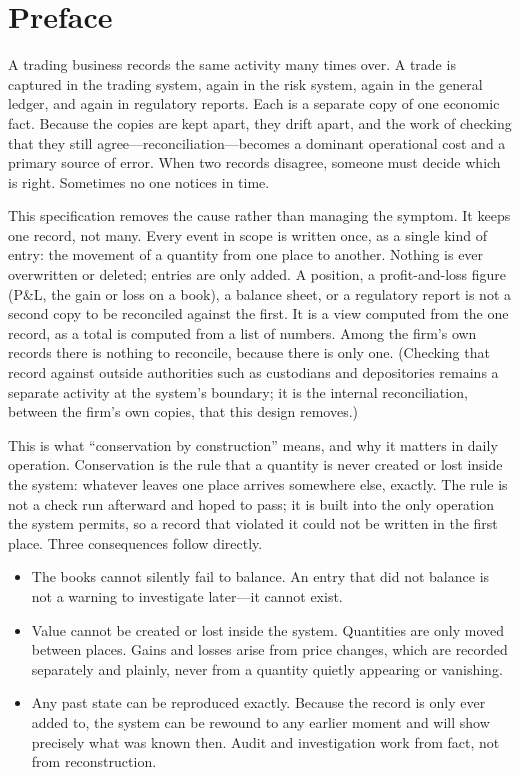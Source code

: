 \section*{Preface}

A trading business records the same activity many times over. A trade is captured in the
trading system, again in the risk system, again in the general ledger, and again in
regulatory reports. Each is a separate copy of one economic fact. Because the copies are
kept apart, they drift apart, and the work of checking that they still agree---reconciliation---becomes
a dominant operational cost and a primary source of error. When two records disagree,
someone must decide which is right. Sometimes no one notices in time.

This specification removes the cause rather than managing the symptom. It keeps one record,
not many. Every event in scope is written once, as a single kind of entry: the movement of
a quantity from one place to another. Nothing is ever overwritten or deleted; entries are
only added. A position, a profit-and-loss figure (P\&L, the gain or loss on a book), a
balance sheet, or a regulatory report is not a second copy to be reconciled against the
first. It is a view computed from the one record, as a total is computed from a list of
numbers. Among the firm's own records there is nothing to reconcile, because there is only
one. (Checking that record against outside authorities such as custodians and depositories
remains a separate activity at the system's boundary; it is the internal reconciliation,
between the firm's own copies, that this design removes.)

This is what ``conservation by construction'' means, and why it matters in daily
operation. Conservation is the rule that a quantity is never created or lost inside the
system: whatever leaves one place arrives somewhere else, exactly. The rule is not a check
run afterward and hoped to pass; it is built into the only operation the system permits, so
a record that violated it could not be written in the first place. Three consequences
follow directly.

\begin{itemize}
\item The books cannot silently fail to balance. An entry that did not balance is not a
warning to investigate later---it cannot exist.
\item Value cannot be created or lost inside the system. Quantities are only moved between
places. Gains and losses arise from price changes, which are recorded separately and
plainly, never from a quantity quietly appearing or vanishing.
\item Any past state can be reproduced exactly. Because the record is only ever added to,
the system can be rewound to any earlier moment and will show precisely what was known
then. Audit and investigation work from fact, not from reconstruction.
\end{itemize}

